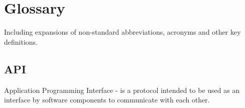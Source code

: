 \documentclass{l3proj}
\begin{document}
\appendix

\chapter{Glossary}

Including expansions of non-standard abbreviations, acronyms and other key definitions.
\section{API}
Application Programming Interface - is a protocol intended to be used as an interface by software components to communicate with each other.



\end{document}
